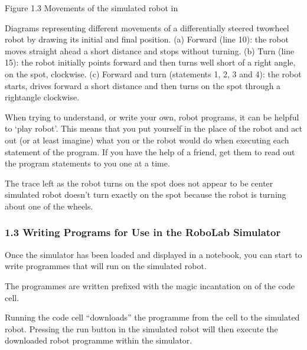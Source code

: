 \documentclass[letterpaper,10pt,english]{sphinxmanual}
\let\sphinxpxdimen\pdfpxdimen\else\newdimen\sphinxpxdimen
\begin{document}
\sphinxincludegraphics[width=346\sphinxpxdimen,height=163\sphinxpxdimen]{{tm129_rob_p2_f007}.jpg}

Figure 1.3 Movements of the simulated robot in 

Diagrams representing different movements of a differentially steered two\sphinxhyphen{}wheel robot by drawing its initial and final position. (a) Forward (line 10): the robot moves straight ahead a short distance and stops without turning. (b) Turn (line 15): the robot initially points forward and then turns well short of a right angle, on the spot, clockwise. (c) Forward and turn (statements 1, 2, 3 and 4): the robot starts, drives forward a short distance and then turns on the spot through a right\sphinxhyphen{}angle
clockwise.

When trying to understand, or write your own, robot programs, it can be helpful to ‘play robot’. This means that you put yourself in the place of the robot and act out (or at least imagine) what you or the robot would do when executing each statement of the program. If you have the help of a friend, get them to read out the program statements to you one at a time.

The trace left as the robot turns on the spot does not appear to be center simulated robot doesn’t turn exactly on the spot because the robot is turning about one of the wheels.


\subsubsection{1.3 Writing Programs for Use in the RoboLab Simulator}
\label{\detokenize{content/01_Robot_Lab/Section_00_01:1.3-Writing-Programs-for-Use-in-the-RoboLab-Simulator}}
Once the simulator has been loaded and displayed in a notebook, you can start to write programmes that will run on the simulated robot.

The programmes are written  prefixed with the magic incantation  on  of the code cell.

Running the code cell “downloads” the programme from the cell to the simulated robot. Pressing the run button in the simulated robot will then execute the downloaded robot programme within the simulator.

\end{document}
